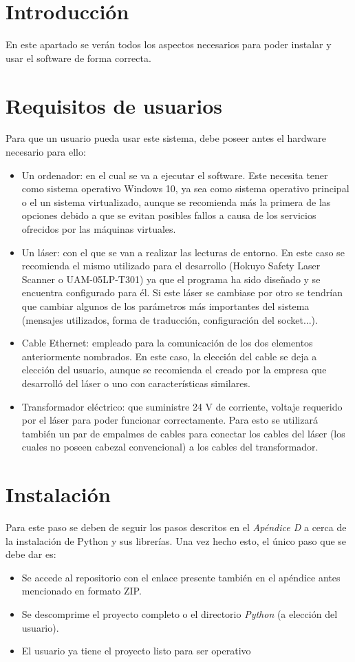 
\section{Introducción}
En este apartado se verán todos los aspectos necesarios para poder instalar y usar el software de forma correcta.

\section{Requisitos de usuarios}
Para que un usuario pueda usar este sistema, debe poseer antes el hardware necesario para ello:
\begin{itemize}
	\item Un ordenador: en el cual se va a ejecutar el software. Este necesita tener como sistema operativo Windows 10, ya sea como sistema operativo principal o el un sistema virtualizado, aunque se recomienda más la primera de las opciones debido a que se evitan posibles fallos a causa de los servicios ofrecidos por las máquinas virtuales.
	\item Un láser: con el que se van a realizar las lecturas de entorno. En este caso se recomienda el mismo utilizado para el desarrollo (Hokuyo Safety Laser Scanner  o UAM-05LP-T301) ya que el programa ha sido diseñado y se encuentra configurado para él. Si este láser se cambiase por otro se tendrían que cambiar algunos de los parámetros más importantes del sistema (mensajes utilizados, forma de traducción, configuración del socket...).
	\item Cable Ethernet: empleado para la comunicación de los dos elementos anteriormente nombrados. En este caso, la elección del cable se deja a elección del usuario, aunque se recomienda el creado por la empresa que desarrolló del láser o uno con características similares.
	\item Transformador eléctrico: que suministre 24 V de corriente, voltaje requerido por el láser para poder funcionar correctamente. Para esto se utilizará también un par de empalmes de cables para conectar los cables del láser (los cuales no poseen cabezal convencional) a los cables del transformador.
\end{itemize}
\section{Instalación}
Para este paso se deben de seguir los pasos descritos en el \textit{Apéndice D} a cerca de la instalación de Python y sus librerías. Una vez hecho esto, el único paso que se debe dar es:
\begin{itemize}
	\item Se accede al repositorio con el enlace presente también en el apéndice antes mencionado en formato ZIP.
	\item Se descomprime el proyecto completo o el directorio \textit{Python} (a elección del usuario).
	\item El usuario ya tiene el proyecto listo para ser operativo
\end{itemize}

